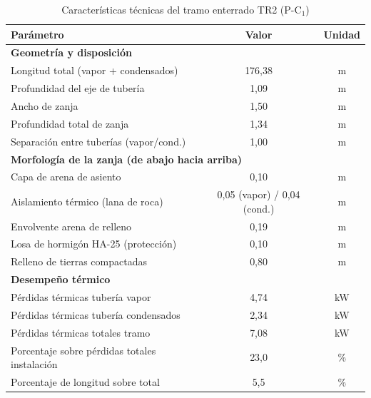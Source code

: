 \begin{table}[H]
	\centering
	\caption{Características técnicas del tramo enterrado TR2 (P-C$_1$)}
	\label{tab:conclusiones-tramo-enterrado}
	\begin{tabular}{lcc}
		\toprule
		\textbf{Parámetro}                            & \textbf{Valor}              & \textbf{Unidad} \\
		\midrule
		\multicolumn{3}{l}{\textbf{Geometría y disposición}}                                          \\
		Longitud total (vapor + condensados)          & 176,38                      & m               \\
		Profundidad del eje de tubería                & 1,09                        & m               \\
		Ancho de zanja                                & 1,50                        & m               \\
		Profundidad total de zanja                    & 1,34                        & m               \\
		Separación entre tuberías (vapor/cond.)       & 1,00                        & m               \\
		\midrule
		\multicolumn{3}{l}{\textbf{Morfología de la zanja (de abajo hacia arriba)}}                   \\
		Capa de arena de asiento                      & 0,10                        & m               \\
		Aislamiento térmico (lana de roca)            & 0,05 (vapor) / 0,04 (cond.) & m               \\
		Envolvente arena de relleno                   & 0,19                        & m               \\
		Losa de hormigón HA-25 (protección)           & 0,10                        & m               \\
		Relleno de tierras compactadas                & 0,80                        & m               \\
		\midrule
		\multicolumn{3}{l}{\textbf{Desempeño térmico}}                                                \\
		Pérdidas térmicas tubería vapor               & 4,74                        & kW              \\
		Pérdidas térmicas tubería condensados         & 2,34                        & kW              \\
		Pérdidas térmicas totales tramo               & 7,08                        & kW              \\
		Porcentaje sobre pérdidas totales instalación & 23,0                        & \%              \\
		Porcentaje de longitud sobre total            & 5,5                         & \%              \\
		\bottomrule
	\end{tabular}
\end{table}

